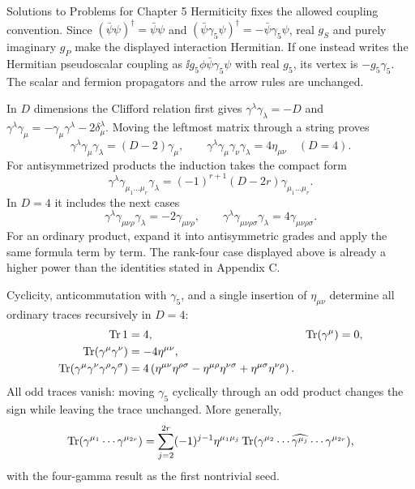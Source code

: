 \begin{bankssolutions}{Solutions to Problems for Chapter 5}
Hermiticity fixes the allowed coupling convention. Since
$(\bar\psi\psi)^\dagger=\bar\psi\psi$ and
$(\bar\psi\gamma_5\psi)^\dagger=-\bar\psi\gamma_5\psi$, real $g_S$ and
purely imaginary $g_P$ make the displayed interaction Hermitian. If one instead
writes the Hermitian pseudoscalar coupling as
$\ii g_5\phi\bar\psi\gamma_5\psi$ with real $g_5$, its vertex is
$-g_5\gamma_5$. The scalar and fermion propagators and the arrow rules are
unchanged.

In $D$ dimensions the Clifford relation first gives
$\gamma^\lambda\gamma_\lambda=-D$ and
$\gamma^\lambda\gamma_\mu=-\gamma_\mu\gamma^\lambda-2\delta^\lambda_\mu$.
Moving the leftmost matrix through a string proves
\begin{equation*}
 \gamma^\lambda\gamma_\mu\gamma_\lambda=(D-2)\gamma_\mu,
 \qquad
 \gamma^\lambda\gamma_\mu\gamma_\nu\gamma_\lambda=4\eta_{\mu\nu}\quad(D=4).
\end{equation*}
For antisymmetrized products the induction takes the compact
form
\begin{equation*}
 \gamma^\lambda\gamma_{\mu_1\ldots\mu_r}\gamma_\lambda
 =(-1)^{r+1}(D-2r)\gamma_{\mu_1\ldots\mu_r}.
\end{equation*}
In $D=4$ it includes the next cases
\begin{equation*}
 \gamma^\lambda\gamma_{\mu\nu\rho}\gamma_\lambda=-2\gamma_{\mu\nu\rho},
 \qquad
 \gamma^\lambda\gamma_{\mu\nu\rho\sigma}\gamma_\lambda=4\gamma_{\mu\nu\rho\sigma}.
\end{equation*}
For an ordinary product, expand it into antisymmetric grades and apply the same
formula term by term. The rank-four case displayed above is already a higher
power than the identities stated in Appendix C.

Cyclicity, anticommutation with $\gamma_5$, and a single insertion of
$\eta_{\mu\nu}$ determine all ordinary traces recursively in $D=4$:
\begin{align*}
 \operatorname{Tr} 1&=4, & \operatorname{Tr}(\gamma^\mu)&=0,\\
 \operatorname{Tr}(\gamma^\mu\gamma^\nu)&=-4\eta^{\mu\nu},\\
 \operatorname{Tr}(\gamma^\mu\gamma^\nu\gamma^\rho\gamma^\sigma)
 &=4\left(\eta^{\mu\nu}\eta^{\rho\sigma}
 -\eta^{\mu\rho}\eta^{\nu\sigma}
 +\eta^{\mu\sigma}\eta^{\nu\rho}\right).
\end{align*}
All odd traces vanish: moving $\gamma_5$ cyclically through an odd product
changes the sign while leaving the trace unchanged. More generally,
\begin{equation*}
 \operatorname{Tr}(\gamma^{\mu_1}\cdots\gamma^{\mu_{2r}})
 =\sum_{j=2}^{2r}(-1)^{j-1}\eta^{\mu_1\mu_j}
 \operatorname{Tr}(\gamma^{\mu_2}\cdots\widehat{\gamma^{\mu_j}}\cdots\gamma^{\mu_{2r}}),
\end{equation*}
with the four-gamma result as the first nontrivial seed.


\end{bankssolutions}
